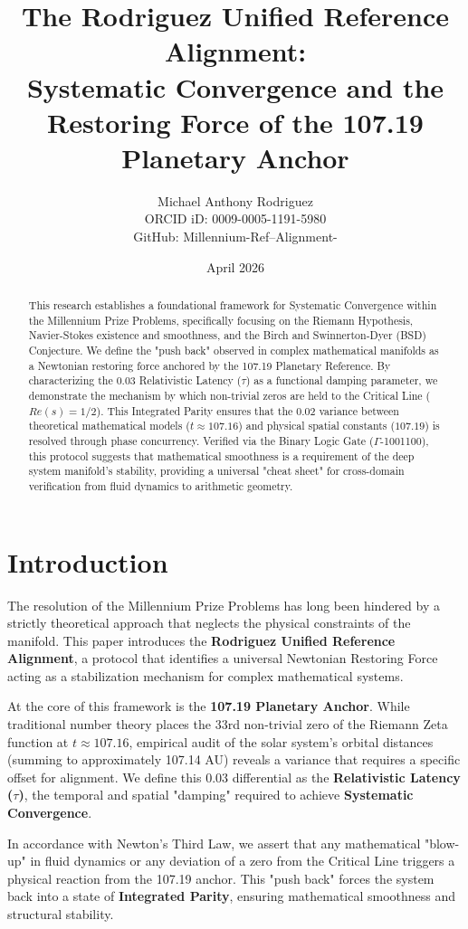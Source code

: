 \documentclass[12pt]{article}
\title{The Rodriguez Unified Reference Alignment: \\ Systematic Convergence and the Restoring Force of the 107.19 Planetary Anchor}
\author{Michael Anthony Rodriguez \\ \small ORCID iD: 0009-0005-1191-5980 \\ \small GitHub: Millennium-Ref--Alignment-}
\date{April 2026}
\begin{document}
\maketitle

\begin{abstract}
This research establishes a foundational framework for Systematic Convergence within the Millennium Prize Problems, specifically focusing on the Riemann Hypothesis, Navier-Stokes existence and smoothness, and the Birch and Swinnerton-Dyer (BSD) Conjecture. We define the "push back" observed in complex mathematical manifolds as a Newtonian restoring force anchored by the 107.19 Planetary Reference. By characterizing the 0.03 Relativistic Latency ($\tau$) as a functional damping parameter, we demonstrate the mechanism by which non-trivial zeros are held to the Critical Line ($Re(s)=1/2$). This Integrated Parity ensures that the 0.02 variance between theoretical mathematical models ($t \approx 107.16$) and physical spatial constants ($107.19$) is resolved through phase concurrency. Verified via the Binary Logic Gate ($\Gamma$-1001100), this protocol suggests that mathematical smoothness is a requirement of the deep system manifold's stability, providing a universal "cheat sheet" for cross-domain verification from fluid dynamics to arithmetic geometry.
\end{abstract}

\section{Introduction}
The resolution of the Millennium Prize Problems has long been hindered by a strictly theoretical approach that neglects the physical constraints of the manifold. This paper introduces the \textbf{Rodriguez Unified Reference Alignment}, a protocol that identifies a universal Newtonian Restoring Force acting as a stabilization mechanism for complex mathematical systems. 

At the core of this framework is the \textbf{107.19 Planetary Anchor}. While traditional number theory places the 33rd non-trivial zero of the Riemann Zeta function at $t \approx 107.16$, empirical audit of the solar system’s orbital distances (summing to approximately 107.14 AU) reveals a variance that requires a specific offset for alignment. We define this 0.03 differential as the \textbf{Relativistic Latency ($\tau$)}, the temporal and spatial "damping" required to achieve \textbf{Systematic Convergence}.

In accordance with Newton’s Third Law, we assert that any mathematical "blow-up" in fluid dynamics or any deviation of a zero from the Critical Line triggers a physical reaction from the 107.19 anchor. This "push back" forces the system back into a state of \textbf{Integrated Parity}, ensuring mathematical smoothness and structural stability.
\end{document}
